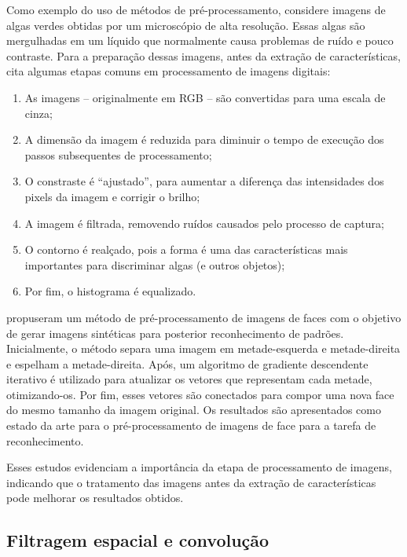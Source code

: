 Como exemplo do uso de métodos de pré-processamento, considere imagens de algas verdes obtidas por um microscópio de alta resolução. Essas algas são mergulhadas em um líquido que normalmente causa problemas de ruído e pouco contraste. Para a preparação dessas imagens, antes da extração de características,  cita algumas etapas comuns em processamento de imagens digitais:

\begin{enumerate}
\item As imagens -- originalmente em RGB -- são convertidas para uma escala de cinza;
\item A dimensão da imagem é reduzida para diminuir o tempo de execução dos passos subsequentes de processamento;
\item O constraste é ``ajustado'', para aumentar a diferença das intensidades dos pixels da imagem e corrigir o brilho;
\item A imagem é filtrada, removendo ruídos causados pelo processo de captura;
\item O contorno é realçado, pois a forma é uma das características mais importantes para discriminar algas (e outros objetos);
\item Por fim, o histograma é equalizado.
\end{enumerate}

 propuseram um método de pré-processamento de imagens de faces com o objetivo de gerar imagens sintéticas para posterior reconhecimento de padrões. Inicialmente, o método separa uma imagem em metade-esquerda e metade-direita e espelham a metade-direita. Após, um algoritmo de gradiente descendente iterativo é utilizado para atualizar os vetores que representam cada metade, otimizando-os. Por fim, esses vetores são conectados para compor uma nova face do mesmo tamanho da imagem original. Os resultados são apresentados como estado da arte para o pré-processamento de imagens de face para a tarefa de reconhecimento.


Esses estudos evidenciam a importância da etapa de processamento de imagens, indicando que o tratamento das imagens antes da extração de características pode melhorar os resultados obtidos.

\subsection{Filtragem espacial e convolução}

